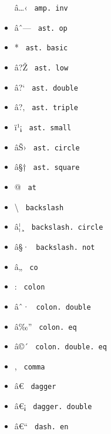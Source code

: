 \begin{itemize}
  \label{symbol-amp.inv}{{ â\ldots‹ }
  \texttt{\ amp.\ inv\ }}
\item
  \label{symbol-ast.op}{{ âˆ--- } \texttt{\ ast.\ op\ }}
\item
  \label{symbol-ast.basic}{{ * }
  \texttt{\ ast.\ basic\ }}
\item
  \label{symbol-ast.low}{{ â?Ž } \texttt{\ ast.\ low\ }}
\item
  \label{symbol-ast.double}{{ â?{}` }
  \texttt{\ ast.\ double\ }}
\item
  \label{symbol-ast.triple}{{ â?‚ }
  \texttt{\ ast.\ triple\ }}
\item
  \label{symbol-ast.small}{{ ï¹¡ }
  \texttt{\ ast.\ small\ }}
\item
  \label{symbol-ast.circle}{{ âŠ› }
  \texttt{\ ast.\ circle\ }}
\item
  \label{symbol-ast.square}{{ â§† }
  \texttt{\ ast.\ square\ }}
\item
  \label{symbol-at}{{ @ } \texttt{\ at\ }}
\item
  \label{symbol-backslash}{{ \textbackslash{} }
  \texttt{\ backslash\ }}
\item
  \label{symbol-backslash.circle}{{ â¦¸ }
  \texttt{\ backslash.\ circle\ }}
\item
  \label{symbol-backslash.not}{{ â§· }
  \texttt{\ backslash.\ not\ }}
\item
  \label{symbol-co}{{ â„ } \texttt{\ co\ }}
\item
  \label{symbol-colon}{{ : } \texttt{\ colon\ }}
\item
  \label{symbol-colon.double}{{ âˆ· }
  \texttt{\ colon.\ double\ }}
\item
  \label{symbol-colon.eq}{{ â‰'' }
  \texttt{\ colon.\ eq\ }}
\item
  \label{symbol-colon.double.eq}{{ â©´ }
  \texttt{\ colon.\ double.\ eq\ }}
\item
  \label{symbol-comma}{{ , } \texttt{\ comma\ }}
\item
  \label{symbol-dagger}{{ â€ } \texttt{\ dagger\ }}
\item
  \label{symbol-dagger.double}{{ â€¡ }
  \texttt{\ dagger.\ double\ }}
\item
  \label{symbol-dash.en}{{ â€`` } \texttt{\ dash.\ en\ }}

\end{itemize}
